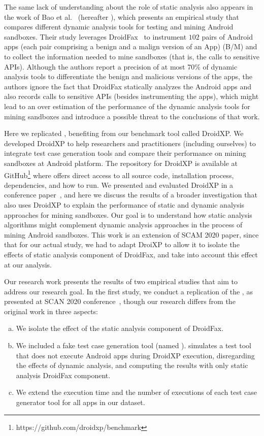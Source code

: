 The same lack of understanding about the role of static analysis also appears in the work of Bao et al.~\cite{DBLP:conf/wcre/BaoLL18} (hereafter \blls), which presents an empirical study that compares different dynamic analysis tools for testing and mining Android sandboxes. Their study leverages DroidFax~\cite{DBLP:conf/icsm/CaiR17a} to instrument $102$ pairs of Android apps (each pair comprising a benign and a malign version of an App) (B/M) and to collect the information needed to mine sandboxes (that is, the calls to sensitive APIs).
Although the authors report a precision of at most 70\% of dynamic analysis tools to differentiate the benign and malicious versions of the apps, the authors ignore the fact that DroidFax statically analyzes the Android apps and also records calls to sensitive APIs (besides instrumenting the apps), which might lead to an over estimation of the performance of the dynamic analysis tools for mining sandboxes and introduce a possible threat to the conclusions of that work.

Here we replicated \blls, benefiting from our benchmark tool called DroidXP. We developed DroidXP to help researchers and practitioners (including ourselves) to integrate test case generation tools and compare their performance on mining sandboxes at Android platform. The repository for DroidXP is available at GitHub\footnote{https://github.com/droidxp/benchmark} where offers direct access to all source code, installation process, dependencies, and how to run. We presented and evaluated DroidXP in a conference paper~\cite{DBLP:conf/scam/CostaMCMVBC20}, and here we discuss the results of a broader investigation that also uses DroidXP to explain the performance of static and dynamic analysis approaches for mining sandboxes. Our goal is to understand how static analysis algorithms might complement dynamic analysis approaches in the process of mining Android sandboxes. This work is an extension of SCAM 2020 paper, since that for our actual study, we had to adapt DroiXP to allow it to isolate the effects of static analysis component of DroidFax, and take into account this effect at our analysis.

Our research work presents the results of two empirical studies that aim to
address our research goal. In the
first study, we conduct a replication of the \blls, as presented at SCAN 2020 conference~\cite{DBLP:conf/scam/CostaMCMVBC20}, though our research differs from the original work in three aspects: 

\begin{enumerate}[(a)]
  \item We isolate the effect of the static analysis component of DroidFax.
   \item We included a fake test
case generation tool (named \joke). \joke simulates a test tool that does not execute Android apps during DroidXP execution, disregarding the effects of dynamic analysis, and computing the results with only static analysis DroidFax component.
\item We extend the execution time and the number of executions of each test case generator tool for all apps
in our dataset.

\end{enumerate}

